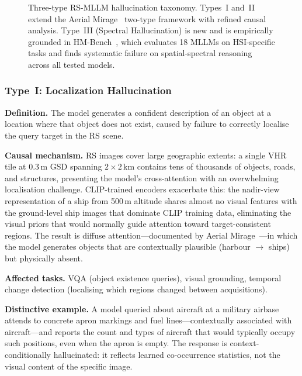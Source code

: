 \begin{figure}[h]
\caption{Three-type RS-MLLM hallucination taxonomy. Types~I and~II
extend the Aerial Mirage~\cite{aerialmirage2026} two-type framework with
refined causal analysis. Type~III (Spectral Hallucination) is new and
is empirically grounded in HM-Bench~\cite{hmbench2026}, which evaluates
18 MLLMs on HSI-specific tasks and finds systematic failure on
spatial-spectral reasoning across all tested models.}\label{fig:hall_tree}
\end{figure}

\subsubsection{Type~I: Localization Hallucination}\label{sec7:type1}

\textbf{Definition.}
The model generates a confident description of an object at a location
where that object does not exist, caused by failure to correctly localise
the query target in the RS scene.

\textbf{Causal mechanism.}
RS images cover large geographic extents: a single VHR tile at 0.3\,m
GSD spanning $2\!\times\!2$\,km contains tens of thousands of objects,
roads, and structures, presenting the model's cross-attention with an
overwhelming localisation challenge. CLIP-trained encoders exacerbate
this: the nadir-view representation of a ship from 500\,m altitude shares
almost no visual features with the ground-level ship images that dominate
CLIP training data, eliminating the visual priors that would normally
guide attention toward target-consistent regions. The result is diffuse
attention---documented by Aerial Mirage~\cite{aerialmirage2026}---in which
the model generates objects that are contextually plausible (harbour
$\to$ ships) but physically absent.

\textbf{Affected tasks.}
VQA (object existence queries), visual grounding, temporal change
detection (localising which regions changed between acquisitions).

\textbf{Distinctive example.}
A model queried about aircraft at a military airbase attends to concrete
apron markings and fuel lines---contextually associated with aircraft---and
reports the count and types of aircraft that would typically occupy such
positions, even when the apron is empty. The response is
context-conditionally hallucinated: it reflects learned co-occurrence
statistics, not the visual content of the specific image.

